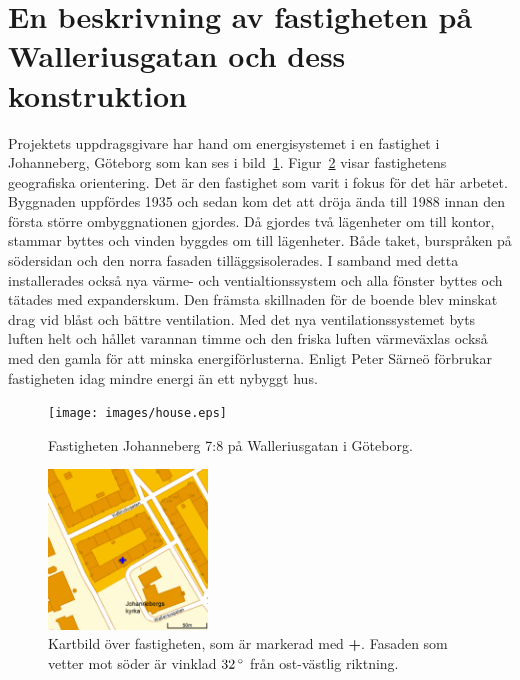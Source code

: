 \section{En beskrivning av fastigheten på Walleriusgatan och dess konstruktion}
\label{subsec:thehouse}




Projektets uppdragsgivare har hand om energisystemet i en fastighet i Johanneberg,
Göteborg som kan ses i bild~\ref{fig:thehouse:house}. Figur~\ref{fig:thehouse:map}
visar fastighetens geografiska orientering.
Det är den fastighet som varit i fokus för det här arbetet. Byggnaden uppfördes 1935\cite{ritningar_urspr}
och sedan kom det att dröja ända till 1988 innan den första större ombyggnationen gjordes.
Då gjordes två lägenheter om till kontor, stammar byttes och vinden byggdes om till lägenheter.
Både taket, burspråken på södersidan och den norra fasaden tilläggsisolerades.
I samband med detta installerades också nya värme- och ventialtionssystem och alla
fönster byttes och tätades med expanderskum. Den främsta skillnaden för de boende
blev minskat drag vid blåst och bättre ventilation.  Med det nya ventilationssystemet
byts luften helt och hållet varannan timme och den friska luften värmeväxlas också med den gamla för att minska energiförlusterna. Enligt Peter Särneö\cite{petersarneo}
förbrukar fastigheten idag mindre energi än ett nybyggt hus.

\begin{figure}
\centering
\texttt{[image: images/house.eps]}
\caption{Fastigheten Johanneberg 7:8 på Walleriusgatan i Göteborg.}
\label{fig:thehouse:house}
\end{figure}

\begin{figure}
\centering
\includegraphics[width=1.67in,height=1.67in]{images/map.eps}
\caption{Kartbild över fastigheten, som är markerad med \textbf{\color{blue}+}. Fasaden som vetter mot söder är vinklad $\unit[32]{^\circ}$ från
ost-västlig riktning.}
\label{fig:thehouse:map}
\end{figure}

